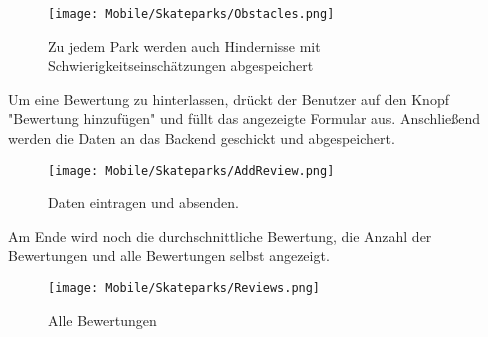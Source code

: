 \begin{figure}[H]
  \begin{center}
    \texttt{[image: Mobile/Skateparks/Obstacles.png]}
    \caption{Zu jedem Park werden auch Hindernisse mit Schwierigkeitseinschätzungen abgespeichert}
  \end{center}
\end{figure}

Um eine Bewertung zu hinterlassen, drückt der Benutzer auf den Knopf "Bewertung hinzufügen" und
füllt das angezeigte Formular aus. Anschließend werden die Daten an das Backend geschickt und
abgespeichert.

\begin{figure}[H]
  \begin{center}
    \texttt{[image: Mobile/Skateparks/AddReview.png]}
    \caption{Daten eintragen und absenden.}
  \end{center}
\end{figure}

Am Ende wird noch die durchschnittliche Bewertung, die Anzahl der Bewertungen und alle Bewertungen
selbst angezeigt.

\begin{figure}[H]
  \begin{center}
    \texttt{[image: Mobile/Skateparks/Reviews.png]}
    \caption{Alle Bewertungen}
  \end{center}
\end{figure}

